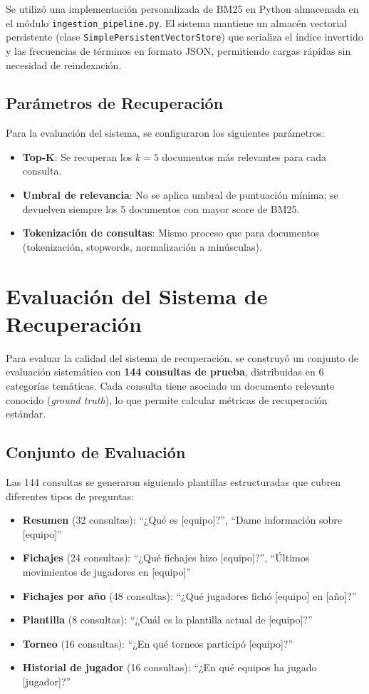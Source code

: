 Se utilizó una implementación personalizada de BM25 en Python almacenada en el módulo \texttt{ingestion\_pipeline.py}. El sistema mantiene un almacén vectorial persistente (clase \texttt{SimplePersistentVectorStore}) que serializa el índice invertido y las frecuencias de términos en formato JSON, permitiendo cargas rápidas sin necesidad de reindexación.

\subsection{Parámetros de Recuperación}

Para la evaluación del sistema, se configuraron los siguientes parámetros:
\begin{itemize}
    \item \textbf{Top-K}: Se recuperan los $k = 5$ documentos más relevantes para cada consulta.
    \item \textbf{Umbral de relevancia}: No se aplica umbral de puntuación mínima; se devuelven siempre los 5 documentos con mayor score de BM25.
    \item \textbf{Tokenización de consultas}: Mismo proceso que para documentos (tokenización, stopwords, normalización a minúsculas).
\end{itemize}

\section{Evaluación del Sistema de Recuperación}

Para evaluar la calidad del sistema de recuperación, se construyó un conjunto de evaluación sistemático con \textbf{144 consultas de prueba}, distribuidas en 6 categorías temáticas. Cada consulta tiene asociado un documento relevante conocido (\textit{ground truth}), lo que permite calcular métricas de recuperación estándar.

\subsection{Conjunto de Evaluación}

Las 144 consultas se generaron siguiendo plantillas estructuradas que cubren diferentes tipos de preguntas:

\begin{itemize}
    \item \textbf{Resumen} (32 consultas): ``¿Qué es [equipo]?'', ``Dame información sobre [equipo]''
    \item \textbf{Fichajes} (24 consultas): ``¿Qué fichajes hizo [equipo]?'', ``Últimos movimientos de jugadores en [equipo]''
    \item \textbf{Fichajes por año} (48 consultas): ``¿Qué jugadores fichó [equipo] en [año]?''
    \item \textbf{Plantilla} (8 consultas): ``¿Cuál es la plantilla actual de [equipo]?''
    \item \textbf{Torneo} (16 consultas): ``¿En qué torneos participó [equipo]?''
    \item \textbf{Historial de jugador} (16 consultas): ``¿En qué equipos ha jugado [jugador]?''
\end{itemize}

